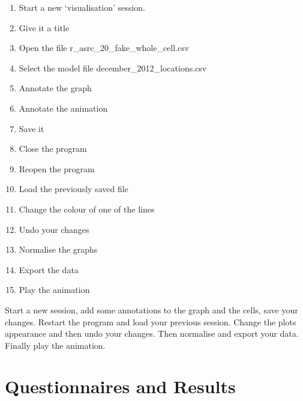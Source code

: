 \begin{enumerate}
\item Start a new `visualisation' session.
\item Give it a title
\item Open the file r\_asrc\_20\_fake\_whole\_cell.csv
\item Select the model file december\_2012\_locations.csv
\item Annotate the graph
\item Annotate the animation
\item Save it
\item Close the program
\item Reopen the program
\item Load the previously saved file
\item Change the colour of one of the lines
\item Undo your changes
\item Normalise the graphs
\item Export the data
\item Play the animation
\end{enumerate}

Start a new session, add some annotations to the graph and the cells, save your changes.  Restart the program and load your previous session.  Change the plots appearance and then undo your changes.  Then normalise and export your data.  Finally play the animation.

\clearpage

\section{Questionnaires and Results}
\label{sec:qs}

